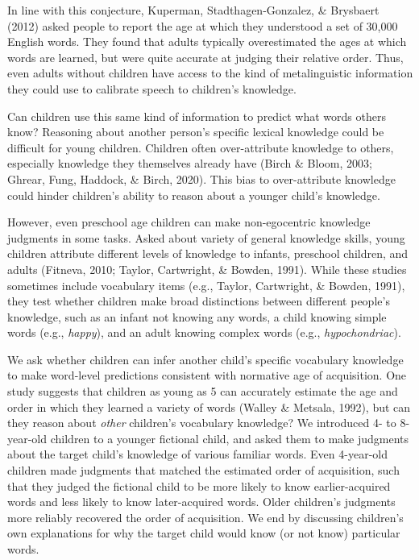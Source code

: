 \documentclass[10pt, letterpaper]{article}
\begin{document}
In line with this conjecture, Kuperman, Stadthagen-Gonzalez, \&
Brysbaert (2012) asked people to report the age at which they understood
a set of 30,000 English words. They found that adults typically
overestimated the ages at which words are learned, but were quite
accurate at judging their relative order. Thus, even adults without
children have access to the kind of metalinguistic information they
could use to calibrate speech to children's knowledge.

Can children use this same kind of information to predict what words
others know? Reasoning about another person's specific lexical knowledge
could be difficult for young children. Children often over-attribute
knowledge to others, especially knowledge they themselves already have
(Birch \& Bloom, 2003; Ghrear, Fung, Haddock, \& Birch, 2020). This bias
to over-attribute knowledge could hinder children's ability to reason
about a younger child's knowledge.

However, even preschool age children can make non-egocentric knowledge
judgments in some tasks. Asked about variety of general knowledge
skills, young children attribute different levels of knowledge to
infants, preschool children, and adults (Fitneva, 2010; Taylor,
Cartwright, \& Bowden, 1991). While these studies sometimes include
vocabulary items (e.g., Taylor, Cartwright, \& Bowden, 1991), they test
whether children make broad distinctions between different people's
knowledge, such as an infant not knowing any words, a child knowing
simple words (e.g., \emph{happy}), and an adult knowing complex words
(e.g., \emph{hypochondriac}).

We ask whether children can infer another child's specific vocabulary
knowledge to make word-level predictions consistent with normative age
of acquisition. One study suggests that children as young as 5 can
accurately estimate the age and order in which they learned a variety of
words (Walley \& Metsala, 1992), but can they reason about \emph{other}
children's vocabulary knowledge? We introduced 4- to 8-year-old children
to a younger fictional child, and asked them to make judgments about the
target child's knowledge of various familiar words. Even 4-year-old
children made judgments that matched the estimated order of acquisition,
such that they judged the fictional child to be more likely to know
earlier-acquired words and less likely to know later-acquired words.
Older children's judgments more reliably recovered the order of
acquisition. We end by discussing children's own explanations for why
the target child would know (or not know) particular words.
\end{document}
